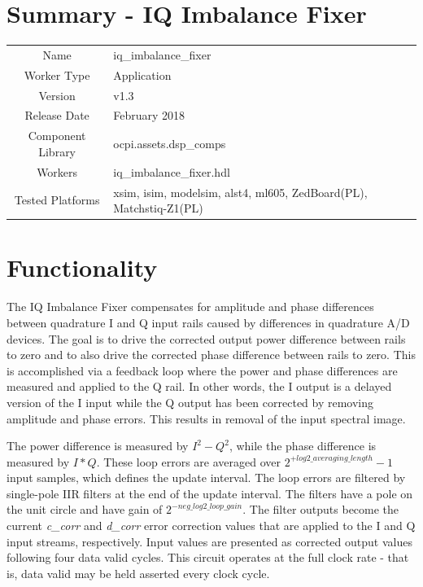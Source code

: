 \documentclass{article}
\author{} %
\date{Version \docVersion} %
\title{\docTitle}
\def\docVersion{1.3}
\def\comp{iq\_imbalance\_fixer}
\def\Comp{IQ Imbalance Fixer}
\begin{document}
\section*{Summary - \Comp}
\begin{tabular}{|c|M{13.5cm}|}
	\hline
	                  &                                                              \\
	\hline
	Name              & \comp                                                        \\
	\hline
	Worker Type       & Application                                                  \\
	\hline
	Version           & v\docVersion \\
	\hline
	Release Date      & February 2018 \\
	\hline
	Component Library & ocpi.assets.dsp\_comps                                        \\
	\hline
	Workers           & \comp.hdl                                                    \\
	\hline
	Tested Platforms  & xsim, isim, modelsim, alst4, ml605, ZedBoard(PL), Matchstiq-Z1(PL) \\
	\hline
\end{tabular}\section*{Functionality}
\begin{flushleft}
	The IQ Imbalance Fixer compensates for amplitude and phase differences between quadrature I and Q input rails caused by differences in quadrature A/D devices. The goal is to drive the corrected output power difference between rails to zero and to also drive the corrected phase difference between rails to zero. This is accomplished via a feedback loop where the power and phase differences are measured and applied to the Q rail. In other words, the I output is a delayed version of the I input while the Q output has been corrected by removing amplitude and phase errors. This results in removal of the input spectral image.\medskip

	The power difference is measured by $I^2 - Q^2$, while the phase difference is measured by $I*Q$. These loop errors are averaged over $2^{+log2\_averaging\_length}-1$ input samples, which defines the update interval. The loop errors are filtered by single-pole IIR filters at the end of the update interval. The filters have a pole on the unit circle and have gain of $2^{-neg\_log2\_loop\_gain}$. The filter outputs become the current \textit{c\_corr} and \textit{d\_corr} error correction values that are applied to the I and Q input streams, respectively. Input values are presented as corrected output values following four data valid cycles. This circuit operates at the full clock rate - that is, data valid may be held asserted every clock cycle.\medskip
\end{flushleft}
\end{document}
